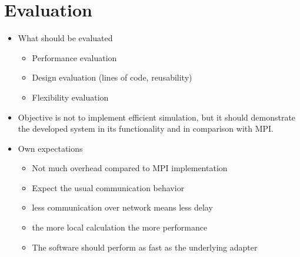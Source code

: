 \chapter{Evaluation}
\label{sec:evaluation}



\begin{itemize}

\item What should be evaluated
  \begin{itemize}
  \item Performance evaluation
  \item Design evaluation (lines of code, reusability)
  \item Flexibility evaluation
  \end{itemize}

\item Objective is not to implement efficient simulation, but
  it should demonstrate the developed system in its functionality
  and in comparison with MPI.

\item Own expectations
  \begin{itemize}
  \item Not much overhead compared to MPI implementation
  \item Expect the usual communication behavior
  \item less communication over network means less delay
  \item the more local calculation the more performance
  \item The software should perform as fast as the
    underlying adapter
  \end{itemize}


\end{itemize}
